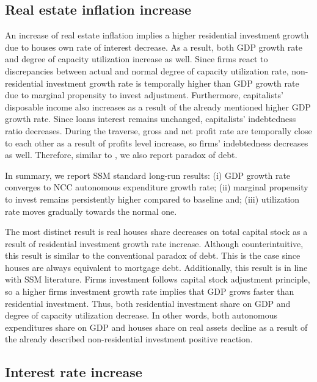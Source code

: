 \documentclass[12pt]{article}
\begin{document}
\subsection{Real estate inflation increase}
\label{sec:org99f2556}
\label{sec:Exp2}


An increase of real estate inflation implies a higher residential investment growth due to houses own rate of interest decrease.
As a result, both GDP growth rate and degree of capacity utilization increase as well.
Since firms react to discrepancies between actual and normal degree of capacity utilization rate, non-residential investment growth rate 
is temporally higher than GDP growth rate due to marginal propensity to invest adjustment.
Furthermore, capitalists' disposable income also increases as a result of the already mentioned higher GDP growth rate.
Since loans interest remains unchanged, capitalists' indebtedness ratio decreases.
During the traverse, gross and net profit rate are temporally close to each other as a result of profits level increase, so firms' indebtedness decreases as well.
Therefore, similar to \textcite{mandarino-2020-worker-debt}, we also report paradox of debt.

In summary, we report SSM standard long-run results:
    (i) GDP growth rate converges to NCC autonomous expenditure growth rate;
    (ii) marginal propensity to invest remains persistently higher compared to baseline and;
    (iii) utilization rate moves gradually towards the normal one.


The most distinct result is real houses share decreases on total capital stock as a result of residential investment growth rate increase.
Although counterintuitive, this result is similar to the conventional paradox of debt.
This is the case since houses are always equivalent to  mortgage debt.
Additionally, this result is in line with SSM literature.
Firms investment follows capital stock adjustment principle, so a higher firms investment growth rate implies that
GDP grows faster than residential investment.
Thus, both residential investment share on GDP and degree of capacity  utilization decrease.
In other words, both autonomous expenditures share on GDP and houses share on real assets decline as a result of the already described non-residential investment positive reaction.
\subsection{Interest rate increase}
\label{sec:org1b8254a}
\label{sec:Exp3}
\end{document}
